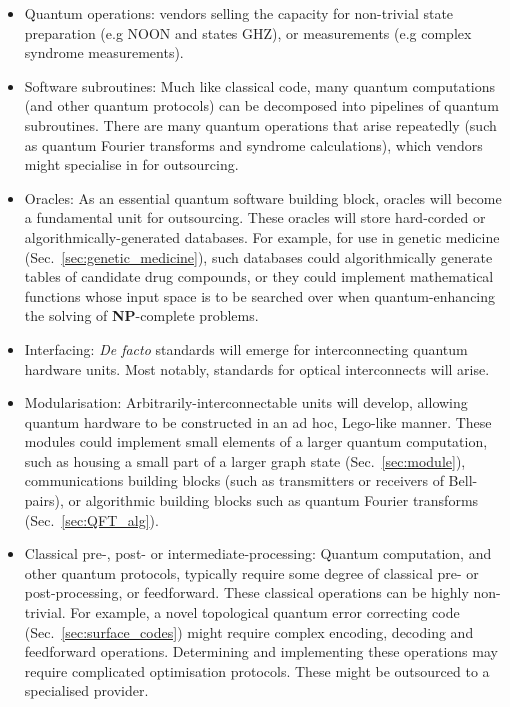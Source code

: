 \begin{itemize}
\item Quantum operations: vendors selling the capacity for non-trivial state preparation (e.g NOON and states GHZ), or measurements (e.g complex syndrome measurements).

\item Software subroutines: Much like classical code, many quantum computations (and other quantum protocols) can be decomposed into pipelines of quantum subroutines. There are many quantum operations that arise repeatedly (such as quantum Fourier transforms and syndrome calculations), which vendors might specialise in for outsourcing.

\item Oracles: As an essential quantum software building block, oracles will become a fundamental unit for outsourcing. These oracles will store hard-corded or algorithmically-generated databases. For example, for use in genetic medicine (Sec.~\ref{sec:genetic_medicine}), such databases could algorithmically generate tables of candidate drug compounds, or they could implement mathematical functions whose input space is to be searched over when quantum-enhancing the solving of \textbf{NP}-complete problems.

\item Interfacing: \textit{De facto} standards will emerge for interconnecting quantum hardware units. Most notably, standards for optical interconnects will arise.

\item Modularisation: Arbitrarily-interconnectable units will develop, allowing quantum hardware to be constructed in an ad hoc, Lego-like manner. These modules could implement small elements of a larger quantum computation, such as housing a small part of a larger graph state (Sec.~\ref{sec:module}), communications building blocks (such as transmitters or receivers of Bell-pairs), or algorithmic building blocks such as quantum Fourier transforms (Sec.~\ref{sec:QFT_alg}).

\item Classical pre-, post- or intermediate-processing: Quantum computation, and other quantum protocols, typically require some degree of classical pre- or post-processing, or feedforward. These classical operations can be highly non-trivial. For example, a novel topological quantum error correcting code (Sec.~\ref{sec:surface_codes}) might require complex encoding, decoding and feedforward operations. Determining and implementing these operations may require complicated optimisation protocols. These might be outsourced to a specialised provider.
\end{itemize}

